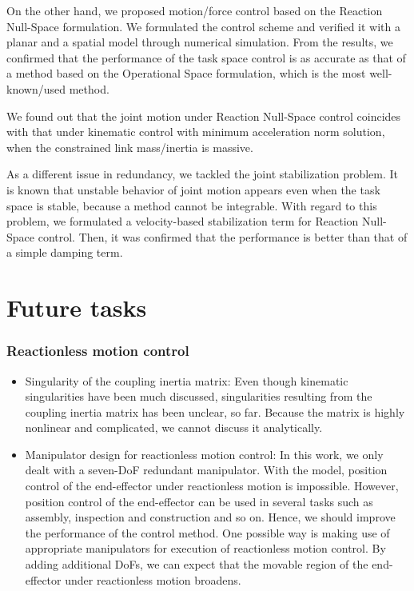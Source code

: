 On the other hand,
we proposed motion/force control based on the Reaction Null-Space formulation.
We formulated the control scheme and verified it with
a  planar and a spatial model through numerical simulation.
From the results,
we confirmed that the performance of the task space control is as accurate as
that of a method based on the Operational Space formulation,
which is the most well-known/used method.

We found out that the joint motion under Reaction Null-Space control
coincides with that under kinematic control with minimum acceleration norm solution,
when the constrained link mass/inertia is massive.

As a different issue in redundancy,
we tackled the joint stabilization problem.
It is known that unstable behavior of joint motion appears even when
the task space is stable,
because a method cannot be integrable.
With regard to this problem,
we formulated a velocity-based stabilization term for Reaction Null-Space control.
Then, it was confirmed that the performance is better than that of a simple damping term.


\section{Future tasks}
\subsubsection{Reactionless motion control}
%
\begin{itemize}
\item Singularity of the coupling inertia matrix:
  Even though kinematic singularities have been much discussed,
  singularities resulting from the coupling inertia matrix has been unclear, so far.
  Because the matrix is highly nonlinear and complicated,
  we cannot discuss it analytically.
\item Manipulator design for reactionless motion control:
  In this work, we only dealt with a seven-DoF redundant manipulator.
  With the model, position control of the end-effector under reactionless motion is impossible.
  However, position control of the end-effector can be used in several tasks such as
  assembly, inspection and construction and so on.
  Hence, we should improve the performance of the control method.
  One possible way is making use of appropriate manipulators for execution of reactionless motion control.
  By adding additional DoFs, we can expect that the movable region of the end-effector under reactionless motion
  broadens.
\end{itemize}
%

